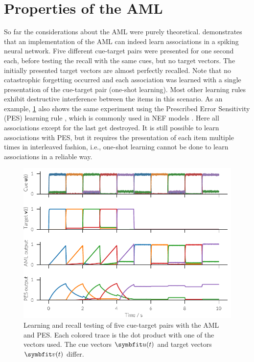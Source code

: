 \section{Properties of the AML}
So far the considerations about the AML were purely theoretical.
 demonstrates that an implementation of the AML can indeed learn associations in a spiking neural network.
Five different cue-target pairs were presented for one second each, before testing the recall with the same cues, but no target vectors.
The initially presented target vectors are almost perfectly recalled.
Note that no catastrophic forgetting occurred and each association was learned with a single presentation of the cue-target pair (one-shot learning).
Most other learning rules exhibit destructive interference between the items in this scenario.
As an example, \cref{fig:aml} also shows the same experiment using the Prescribed Error Sensitivity (PES) learning rule \parencite{bekolay2013}, which is commonly used in NEF models \parencite[e.g.,][]{komer2015,Rasmussen2017}.
Here all associations except for the last get destroyed.
It is still possible to learn associations with PES, but it requires the presentation of each item multiple times in interleaved fashion, i.e., one-shot learning cannot be done to learn associations in a reliable way.
\begin{figure}
    \centering
    \includegraphics{figures/aml}
    \caption[Learning and recall testing of five cue-target pairs with the AML and PES.]{Learning and recall testing of five cue-target pairs with the AML and PES\@. Each colored trace is the dot product with one of the vectors used. The cue vectors $\vc u(t)$ and target vectors $\vc v(t)$ differ.}\label{fig:aml}
\end{figure}

